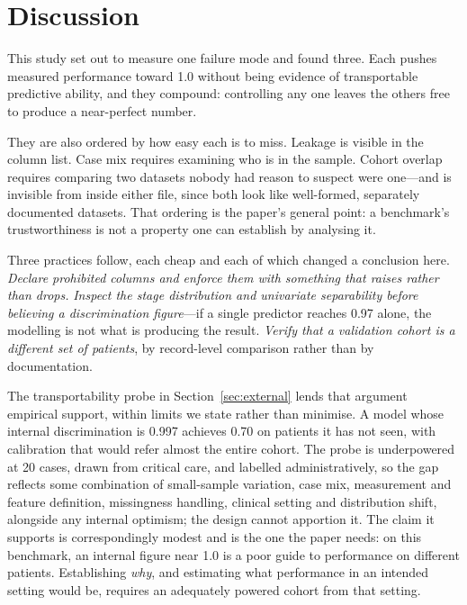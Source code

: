 \documentclass[conference]{IEEEtran}
\begin{document}
\section{Discussion}

This study set out to measure one failure mode and found three. Each pushes
measured performance toward 1.0 without being evidence of transportable
predictive ability, and they compound:
controlling any one leaves the others free to produce a near-perfect number.

They are also ordered by how easy each is to miss. Leakage is visible in the
column list. Case mix requires examining who is in the sample. Cohort overlap
requires comparing two datasets nobody had reason to suspect were one---and is
invisible from inside either file, since both look like well-formed,
separately documented datasets. That ordering is the paper's general point: a
benchmark's trustworthiness is not a property one can establish by analysing
it.

Three practices follow, each cheap and each of which changed a conclusion
here. \emph{Declare prohibited columns and enforce them with something that
raises rather than drops.} \emph{Inspect the stage distribution and univariate
separability before believing a discrimination figure}---if a single predictor
reaches 0.97 alone, the modelling is not what is producing the result.
\emph{Verify that a validation cohort is a different set of patients}, by
record-level comparison rather than by documentation.

The transportability probe in Section~\ref{sec:external} lends that argument
empirical support, within limits we state rather than minimise. A model whose
internal discrimination is 0.997 achieves 0.70 on patients it has not seen,
with calibration that would refer almost the entire cohort. The probe is
underpowered at 20 cases, drawn from critical care, and labelled
administratively, so the gap reflects some combination of small-sample
variation, case mix, measurement and feature definition, missingness
handling, clinical setting and distribution shift, alongside any internal
optimism; the design cannot apportion it. The claim it supports is
correspondingly modest and is the one the paper needs: on this benchmark, an
internal figure near 1.0 is a poor guide to performance on different
patients. Establishing \emph{why}, and estimating what performance in an
intended setting would be, requires an adequately powered cohort from that
setting.
\end{document}
